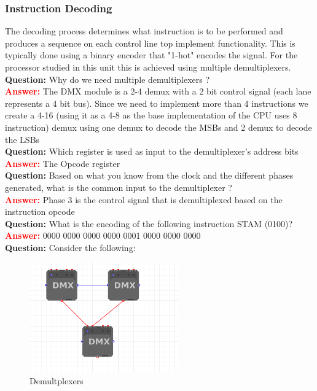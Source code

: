 \documentclass[a4paper, 11pt]{article}
\begin{document}
\subsubsection{Instruction Decoding}
The decoding process determines what instruction is to be performed and produces a sequence on each control line top implement functionality. This is typically done using a binary encoder that "1-hot" encodes the signal. For the processor studied in this unit this is achieved using multiple demultiplexers. \\
\textbf{Question:} Why do we need multiple demultiplexers ? \\
\textcolor{red}{\textbf{Answer:}} The DMX module is a 2-4 demux with a 2 bit control signal (each lane represents a 4 bit bus). Since we need to implement more than 4 instructions we create a 4-16 (using it as a 4-8 as the base implementation of the CPU uses 8 instruction) demux using one demux to decode the MSBs and 2 demux to decode the LSBs\\
\textbf{Question:} Which register is used as input to the demultiplexer's address bits\\
\textcolor{red}{\textbf{Answer:}} The Opcode register\\
\textbf{Question:} Based on what you know from the clock and the different phases generated, what is the common input to the demultiplexer ? \\
\textcolor{red}{\textbf{Answer:}} Phase 3 is the control signal that is demultiplexed based on the instruction opcode\\
\textbf{Question:} What is the encoding of the following instruction STAM (0100)?\\
\textcolor{red}{\textbf{Answer:}} 0000 0000 0000 0000 0001 0000 0000 0000\\
\textbf{Question:} Consider the following:
\begin{figure}[H]
    \centering
    \includegraphics[width =0.57\textwidth]{Images/Screenshot from 2022-12-14 16-31-07.png}
    \caption{Demultplexers}
    \label{fig:demux}
    \end{figure}
\end{document}
